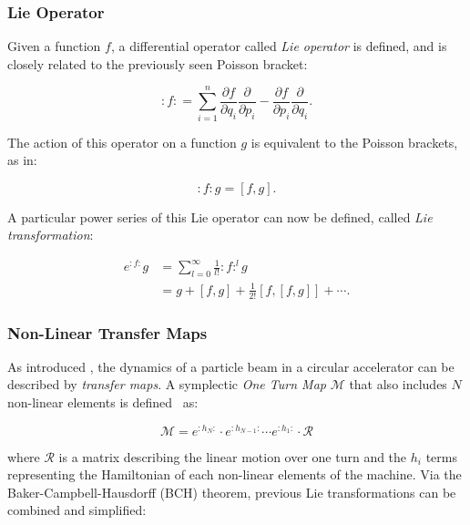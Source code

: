 \subsubsection{Lie Operator}

Given a function $f$, a differential operator called \textit{Lie operator} is defined, and is closely
related to the previously seen Poisson bracket:

\begin{equation}
    :f: = \sum^n_{i=1} \frac{\partial f}{\partial q_i} \frac{\partial}{\partial p_i}
                     - \frac{\partial f}{\partial p_i} \frac{\partial}{\partial q_i}.
\end{equation}

The action of this operator on a function $g$ is equivalent to the Poisson brackets, as in:

\begin{equation}
    :f:g = [f,g].
\end{equation}

A particular power series of this Lie operator can now be defined, called \textit{Lie
transformation}:

\begin{equation}
    \begin{aligned}
        e^{:f:}g &= \sum_{l=0}^\infty \frac{1}{l!} :f:^l g \\
                 &= g + [f,g] + \frac{1}{2!}[f, [f, g]] + \cdots .
    \end{aligned}
\end{equation}



\subsubsection{Non-Linear Transfer Maps}

As introduced , the dynamics of a particle beam in a circular accelerator can be
described by \textit{transfer maps}. A symplectic \textit{One Turn Map} $\mathcal{M}$ that also
includes $N$ non-linear elements is defined~\cite{dragt_overview_2013} as:

\begin{equation}
    \mathcal{M} = e^{:h_N:} \cdot e^{:h_{N-1}:} \cdots e^{:h_1:} \cdot \mathcal{R}
\end{equation}

where $\mathcal{R}$ is a matrix describing the linear motion over one turn and the $h_i$ terms
representing the Hamiltonian of each non-linear elements of the machine.
Via the Baker-Campbell-Hausdorff (BCH) theorem, previous Lie transformations can be combined and
simplified:

